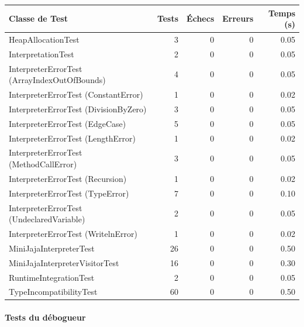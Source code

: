 \begin{center}
\small
\begin{tabular}{|l|r|r|r|r|}
\hline
\rowcolor{headerblue!20}
\textbf{Classe de Test} & \textbf{Tests} & \textbf{Échecs} & \textbf{Erreurs} & \textbf{Temps (s)} \\
\hline
HeapAllocationTest & 3 & 0 & 0 & 0.05 \\
\hline
InterpretationTest & 2 & 0 & 0 & 0.05 \\
\hline
InterpreterErrorTest (ArrayIndexOutOfBounds) & 4 & 0 & 0 & 0.05 \\
\hline
InterpreterErrorTest (ConstantError) & 1 & 0 & 0 & 0.02 \\
\hline
InterpreterErrorTest (DivisionByZero) & 3 & 0 & 0 & 0.05 \\
\hline
InterpreterErrorTest (EdgeCase) & 5 & 0 & 0 & 0.05 \\
\hline
InterpreterErrorTest (LengthError) & 1 & 0 & 0 & 0.02 \\
\hline
InterpreterErrorTest (MethodCallError) & 3 & 0 & 0 & 0.05 \\
\hline
InterpreterErrorTest (Recursion) & 1 & 0 & 0 & 0.02 \\
\hline
InterpreterErrorTest (TypeError) & 7 & 0 & 0 & 0.10 \\
\hline
InterpreterErrorTest (UndeclaredVariable) & 2 & 0 & 0 & 0.05 \\
\hline
InterpreterErrorTest (WritelnError) & 1 & 0 & 0 & 0.02 \\
\hline
MiniJajaInterpreterTest & 26 & 0 & 0 & 0.50 \\
\hline
MiniJajaInterpreterVisitorTest & 16 & 0 & 0 & 0.30 \\
\hline
RuntimeIntegrationTest & 2 & 0 & 0 & 0.05 \\
\hline
\rowcolor{successgreen!20}
TypeIncompatibilityTest & 60 & 0 & 0 & 0.50 \\
\hline
\end{tabular}
\end{center}

\paragraph{Tests du débogueur}

